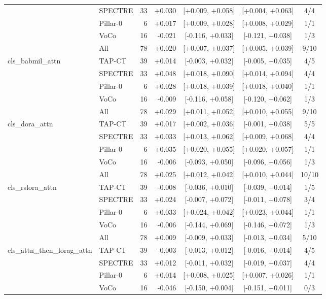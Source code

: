 \begin{tabular}{@{}llrrccc@{}}
 & SPECTRE & 33 & +0.030 & [+0.009, +0.058] & [+0.004, +0.063] & 4/4 \\
 & Pillar-0 & 6 & +0.017 & [+0.009, +0.028] & [+0.008, +0.029] & 1/1 \\
 & VoCo & 16 & -0.021 & [-0.116, +0.033] & [-0.121, +0.038] & 1/3 \\
 & All & 78 & +0.020 & [+0.007, +0.037] & [+0.005, +0.039] & 9/10 \\
\addlinespace[2pt]
cls\_babmil\_attn & TAP-CT & 39 & +0.014 & [-0.003, +0.032] & [-0.005, +0.035] & 4/5 \\
 & SPECTRE & 33 & +0.048 & [+0.018, +0.090] & [+0.014, +0.094] & 4/4 \\
 & Pillar-0 & 6 & +0.028 & [+0.018, +0.039] & [+0.018, +0.040] & 1/1 \\
 & VoCo & 16 & -0.009 & [-0.116, +0.058] & [-0.120, +0.062] & 1/3 \\
 & All & 78 & +0.029 & [+0.011, +0.052] & [+0.010, +0.055] & 9/10 \\
\addlinespace[2pt]
cls\_dora\_attn & TAP-CT & 39 & +0.017 & [+0.002, +0.036] & [-0.001, +0.038] & 5/5 \\
 & SPECTRE & 33 & +0.033 & [+0.013, +0.062] & [+0.009, +0.068] & 4/4 \\
 & Pillar-0 & 6 & +0.035 & [+0.020, +0.055] & [+0.020, +0.057] & 1/1 \\
 & VoCo & 16 & -0.006 & [-0.093, +0.050] & [-0.096, +0.056] & 1/3 \\
 & All & 78 & +0.025 & [+0.012, +0.042] & [+0.010, +0.044] & 10/10 \\
\addlinespace[2pt]
cls\_rslora\_attn & TAP-CT & 39 & -0.008 & [-0.036, +0.010] & [-0.039, +0.014] & 1/5 \\
 & SPECTRE & 33 & +0.024 & [-0.007, +0.072] & [-0.011, +0.078] & 3/4 \\
 & Pillar-0 & 6 & +0.033 & [+0.024, +0.042] & [+0.023, +0.044] & 1/1 \\
 & VoCo & 16 & -0.006 & [-0.144, +0.069] & [-0.146, +0.072] & 1/3 \\
 & All & 78 & +0.009 & [-0.009, +0.033] & [-0.013, +0.034] & 5/10 \\
\addlinespace[2pt]
cls\_attn\_then\_lorag\_attn & TAP-CT & 39 & -0.003 & [-0.013, +0.012] & [-0.016, +0.014] & 4/5 \\
 & SPECTRE & 33 & +0.012 & [-0.011, +0.032] & [-0.019, +0.037] & 4/4 \\
 & Pillar-0 & 6 & +0.014 & [+0.008, +0.025] & [+0.007, +0.026] & 1/1 \\
 & VoCo & 16 & -0.046 & [-0.150, +0.004] & [-0.151, +0.011] & 0/3 \\

\end{tabular}
